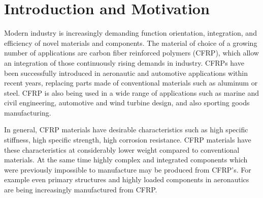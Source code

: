 


\section{Introduction and Motivation}
\label{sec:intro}
Modern industry is increasingly demanding function orientation, integration, and efficiency of novel materials and components. The material of choice of a growing number of applications are carbon fiber reinforced polymers (CFRP), which allow an integration of those continuously rising demands in industry. CFRPs have been successfully introduced in aeronautic and automotive applications within recent years, replacing  parts made of conventional materials such as aluminum or steel. CFRP is also being used in a wide range of applications such as marine and civil engineering, automotive and wind turbine design, and also sporting goods manufacturing. 

In general, CFRP materials have desirable characteristics such as high specific stiffness, high specific strength, high corrosion resistance. CFRP materials have these characteristics  at considerably lower weight compared to conventional materials.
At the same time highly complex and integrated components which were previously  impossible to manufacture may be produced from CFRP's.
For example even primary structures and highly loaded components in aeronautics are being increasingly manufactured from CFRP.




